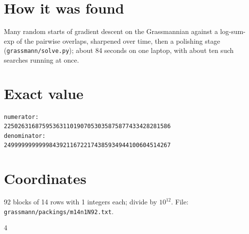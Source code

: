 \documentclass[11pt,a4paper]{article}
\begin{document}
\section{How it was found}
Many random starts of gradient descent on the Grassmannian against a log-sum-exp of the pairwise overlaps, sharpened over time, then a polishing stage (\texttt{grassmann/solve.py}); about 84 seconds on one laptop, with about ten such searches running at once.


\appendix
\section{Exact value}
{\small
\begin{verbatim}
numerator:
225026316875953631101907053035875877433428281586
denominator:
249999999999984392116722174385934944100604514267
\end{verbatim}}

\section{Coordinates}
92 blocks of 14 rows with 1 integers each; divide by $10^{12}$. File: \texttt{grassmann/packings/m14n1N92.txt}.
{\tiny
\begin{multicols}{4}
\end{multicols}}
\end{document}
